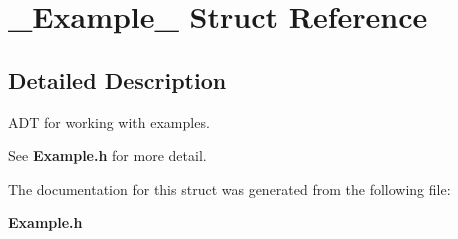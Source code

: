 \section{\_\-Example\_\- Struct Reference}
\label{struct__Example__}


\subsection{Detailed Description}
ADT for working with examples. 

See {\bf Example.h} for more detail. 



The documentation for this struct was generated from the following file:\begin{CompactItemize}
\item 
{\bf Example.h}\end{CompactItemize}
